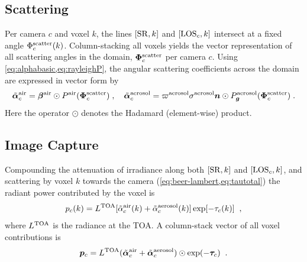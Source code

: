 \documentclass[10pt,letterpaper]{article}
\newcommand{\vect}[1]{\bm{#1}}
\begin{document}
\subsection{Scattering}
\label{sec:scattering}

Per camera $c$ and voxel $k$, the lines $[{\rm SR},k]$ and $[{\rm
  LOS}_c,k]$ intersect at a fixed angle $\Phi^{\rm scatter}_c(k)$.
Column-stacking all voxels yields the vector representation of all
scattering angles in the domain, $\vect{\Phi}^{\rm scatter}_c$ per
camera $c$.
Using \cref{eq:alphabasic,eq:rayleighP}, the angular scattering
coefficients across the domain are expressed in vector form by
\begin{equation}
  \tilde{\vect{\alpha}}^{\rm air}_c =
  \vect{\beta}^{\rm air} \odot P^{\rm air}(\vect{\Phi}^{\rm scatter}_c)\;,
  \quad
  \tilde{\vect{\alpha}}^{\rm aerosol}_c =
  \varpi^{\rm aerosol} \sigma^{\rm aerosol}
  {\bm n} \odot P^{\rm aerosol}_{\bm g}(\vect{\Phi}^{\rm scatter}_c) \;.
  \label{eq:alpha_matrix}
\end{equation}
Here the operator $\odot$ denotes the Hadamard (element-wise) product.


\subsection{Image Capture}
\label{sec:captured-image}

Compounding the attenuation of irradiance along both $[{\rm SR},k]$
and $[{\rm LOS}_c,k]$, and scattering by voxel $k$ towards the camera
(\cref{eq:beer-lambert,eq:tautotal}) the radiant power
contributed by the voxel is
\begin{equation}
  p_c(k)= L^{\rm TOA}
  [\tilde{\alpha}^{\rm air}_c(k) + \tilde{\alpha}^{\rm aerosol}_c(k)]
  \exp[-\tau_c(k)]
  \;\;,
  \label{eq:ick}
\end{equation}
where $L^{\rm TOA}$ is the radiance at the TOA. A column-stack vector
of all voxel contributions is
\begin{equation}
  {\bm p}_c= L^{\rm TOA}
  (\tilde{\vect{\alpha}}^{\rm air}_c + \tilde{\vect{\alpha}}^{\rm aerosol}_c)
  \odot \exp(-\vect{\tau}_c)
  \;\;.
  \label{eq:pc}
\end{equation}
\end{document}
